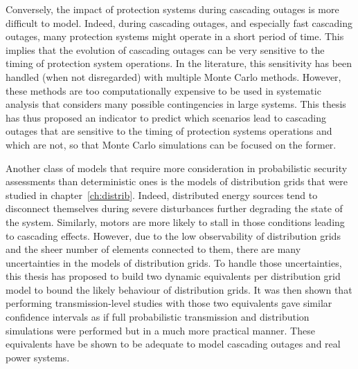 Conversely, the impact of protection systems during cascading outages is more difficult to model. Indeed, during cascading outages, and especially fast cascading outages, many protection systems might operate in a short period of time. This implies that the evolution of cascading outages can be very sensitive to the timing of protection system operations. In the literature, this sensitivity has been handled (when not disregarded) with multiple Monte Carlo methods. However, these methods are too computationally expensive to be used in systematic analysis that considers many possible contingencies in large systems. This thesis has thus proposed an indicator to predict which scenarios lead to cascading outages that are sensitive to the timing of protection systems operations and which are not, so that Monte Carlo simulations can be focused on the former.

Another class of models that require more consideration in probabilistic security assessments than deterministic ones is the models of distribution grids that were studied in chapter~\ref{ch:distrib}. Indeed, distributed energy sources tend to disconnect themselves during severe disturbances further degrading the state of the system. Similarly, motors are more likely to stall in those conditions leading to cascading effects. However, due to the low observability of distribution grids and the sheer number of elements connected to them, there are many uncertainties in the models of distribution grids. To handle those uncertainties, this thesis has proposed to build two dynamic equivalents per distribution grid model to bound the likely behaviour of distribution grids. It was then shown that performing transmission-level studies with those two equivalents gave similar confidence intervals as if full probabilistic transmission and distribution simulations were performed but in a much more practical manner. These equivalents have be shown to be adequate to model cascading outages and real power systems.

